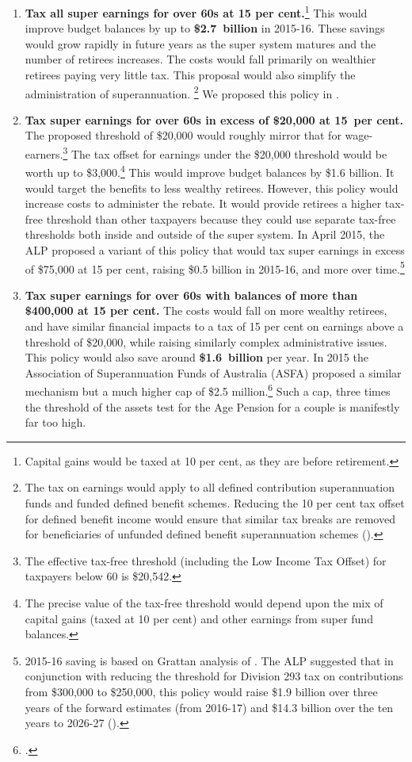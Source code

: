 \begin{enumerate}
\item \textbf{Tax all super earnings for over 60s at 15 per cent.}\footnote{Capital gains would be taxed at 10 per cent, as they are before retirement.}  This would improve budget balances by up to \textbf{\$2.7~billion} in 2015-16. These savings would grow rapidly in future years as the super system matures and the number of retirees increases. The costs would fall primarily on wealthier retirees paying very little tax. This proposal would also simplify the administration of superannuation.%
\footnote{The tax on earnings would apply to all defined contribution superannuation funds and funded defined benefit schemes. Reducing the 10 per cent tax offset for defined benefit income would ensure that similar tax breaks are removed for beneficiaries of unfunded defined benefit superannuation schemes (\textcite{ALP2015FairerSuper}).}  We proposed this policy in . 
%
\item \textbf{Tax super earnings for over 60s in excess of \$20,000 at 15~per cent.} The proposed threshold of \$20,000 would roughly mirror that for wage-earners.\footnote{The effective tax-free threshold (including the Low Income Tax Offset) for taxpayers below 60 is \$20,542.}  The tax offset for earnings under the \$20,000 threshold would be worth up to \$3,000.\footnote{The precise value of the tax-free threshold would depend upon the mix of capital gains (taxed at 10 per cent) and other earnings from super fund balances.}  This would improve budget balances by \$1.6 billion. It would target the benefits to less wealthy retirees. However, this policy would increase costs to administer the rebate. It would provide retirees a higher tax-free threshold than other taxpayers because they could use separate tax-free thresholds both inside and outside of the super system. In April 2015, the ALP proposed a variant of this policy that would tax super earnings in excess of \$75,000 at 15 per cent, raising \$0.5 billion in 2015-16, and more over time.\footnote{2015-16 saving is based on Grattan analysis of \textcite{ABS2013t}. The ALP suggested that in conjunction with reducing the threshold for Division 293 tax on contributions from \$300,000 to \$250,000, this policy would raise \$1.9 billion over three years of the forward estimates (from 2016-17) and \$14.3 billion over the ten years to 2026-27 (\textcite{ALP2015FairerSuper}).}
%
\item \textbf{Tax super earnings for over 60s with balances of more than \$400,000 at 15 per cent.} The costs would fall on more wealthy retirees, and have similar financial impacts to a tax of 15 per cent on earnings above a threshold of \$20,000, while raising similarly complex administrative issues. This policy would also save around \textbf{\$1.6~billion} per year. In 2015 the Association of Superannuation Funds of Australia (ASFA) proposed a similar mechanism but a much higher cap of \$2.5 million.\footcite{Clare2015b}  Such a cap, three times the threshold of the assets test for the Age Pension for a couple is manifestly far too high.%

\end{enumerate}
